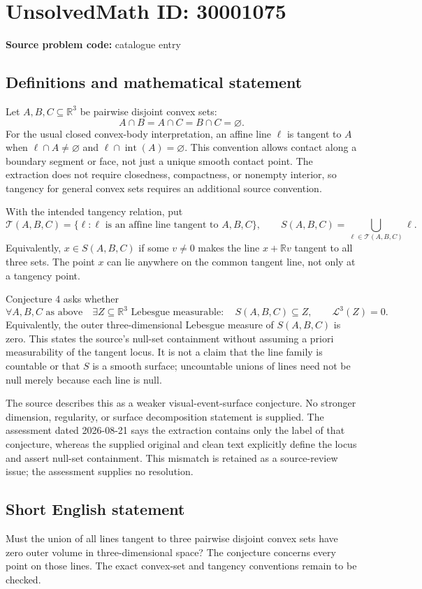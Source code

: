 \documentclass[11pt]{article}
\newcommand{\R}{\mathbb{R}}
\begin{document}
\section*{UnsolvedMath ID: 30001075}
\textbf{Source problem code:} catalogue entry
\subsection{Definitions and mathematical statement}
Let \(A,B,C\subseteq\R^3\) be pairwise disjoint convex sets:
\[
 A\cap B=A\cap C=B\cap C=\varnothing.
\]
For the usual closed convex-body interpretation, an affine line \(\ell\) is tangent to \(A\) when \(\ell\cap A\ne\varnothing\) and \(\ell\cap\operatorname{int}(A)=\varnothing\). This convention allows contact along a boundary segment or face, not just a unique smooth contact point. The extraction does not require closedness, compactness, or nonempty interior, so tangency for general convex sets requires an additional source convention.

With the intended tangency relation, put
\[
 \mathcal T(A,B,C)=\{\ell:\ell\text{ is an affine line tangent to }A,B,C\},
 \qquad
 S(A,B,C)=\bigcup_{\ell\in\mathcal T(A,B,C)}\ell.
\]
Equivalently, \(x\in S(A,B,C)\) if some \(v\ne0\) makes the line \(x+\R v\) tangent to all three sets. The point \(x\) can lie anywhere on the common tangent line, not only at a tangency point.

Conjecture 4 asks whether
\[
 \forall A,B,C\text{ as above}\quad
 \exists Z\subseteq\R^3\text{ Lebesgue measurable}:\quad
 S(A,B,C)\subseteq Z,\qquad\mathcal L^3(Z)=0.
\]
Equivalently, the outer three-dimensional Lebesgue measure of \(S(A,B,C)\) is zero. This states the source's null-set containment without assuming a priori measurability of the tangent locus. It is not a claim that the line family is countable or that \(S\) is a smooth surface; uncountable unions of lines need not be null merely because each line is null.

The source describes this as a weaker visual-event-surface conjecture. No stronger dimension, regularity, or surface decomposition statement is supplied. The assessment dated 2026-08-21 says the extraction contains only the label of that conjecture, whereas the supplied original and clean text explicitly define the locus and assert null-set containment. This mismatch is retained as a source-review issue; the assessment supplies no resolution.
\subsection{Short English statement}
Must the union of all lines tangent to three pairwise disjoint convex sets have zero outer volume in three-dimensional space? The conjecture concerns every point on those lines. The exact convex-set and tangency conventions remain to be checked.
\end{document}
